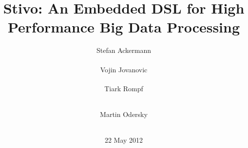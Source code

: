\documentclass{acm_proc_article-sp}
\newcommand{\tool}{Stivo\xspace}
\begin{document}

    
  \title{\tool: An Embedded DSL for High Performance Big Data Processing}


  \author{
	\alignauthor
	Stefan Ackermann\\
	 \\
        \alignauthor
        Vojin Jovanovic\\
        \\
        \alignauthor
        Tiark Rompf\\
        \\
\and
       \alignauthor
        Martin Odersky\\
        \\
  }
  
  
  
  
  \date{22 May 2012}
  \maketitle
  
  \begin{abstract}
    
  \end{abstract}
  


  
  
  
  
  
  
  
  
  
  

  
  
  
  
\end{document}
